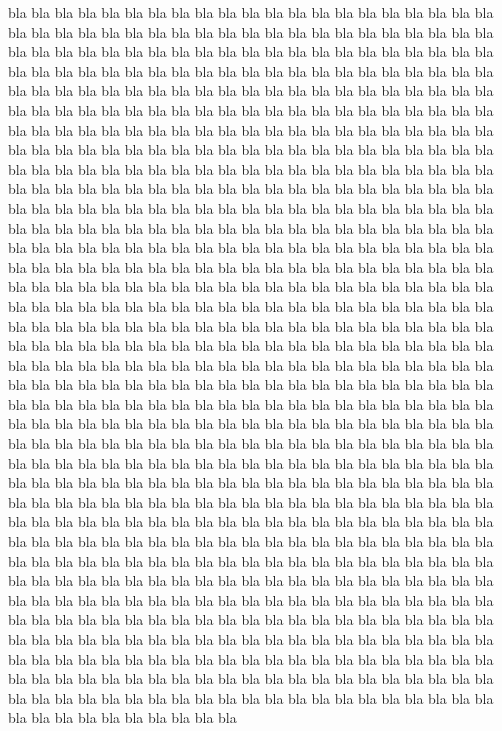 \documentclass[12pt]{book}%
\theoremstyle{definition}%
\begin{document}
bla bla bla bla bla bla bla bla bla bla bla bla bla bla bla bla bla bla bla bla bla bla bla bla bla bla bla bla bla bla bla bla bla bla bla bla bla bla bla bla bla bla bla bla bla bla bla bla bla bla bla bla bla bla bla bla bla bla bla bla bla bla bla bla bla bla bla bla bla bla bla bla bla bla bla bla bla bla bla bla bla bla bla bla bla bla bla bla bla bla bla bla bla bla bla bla bla bla bla bla bla bla bla bla bla bla bla bla bla bla bla bla bla bla bla bla bla bla bla bla bla bla bla bla bla bla bla bla bla bla bla bla bla bla bla bla bla bla bla bla bla bla bla bla bla bla bla bla bla bla bla bla bla bla bla bla bla bla bla bla bla bla bla bla bla bla bla bla bla bla bla bla bla bla bla bla bla bla bla bla bla bla bla bla bla bla bla bla bla bla bla bla bla bla bla bla bla bla bla bla bla bla bla bla bla bla bla bla bla bla bla bla bla bla bla bla bla bla bla bla bla bla bla bla bla bla bla bla bla bla bla bla bla bla bla bla bla bla bla bla bla bla bla bla bla bla bla bla bla bla bla bla bla bla bla bla bla bla bla bla bla bla bla bla bla bla bla bla bla bla bla bla bla bla bla bla bla bla bla bla bla bla bla bla bla bla bla bla bla bla bla bla bla bla bla bla bla bla bla bla bla bla bla bla bla bla bla bla bla bla bla bla bla bla bla bla bla bla bla bla bla bla bla bla bla bla bla bla bla bla bla bla bla bla bla bla bla bla bla bla bla bla bla bla bla bla bla bla bla bla bla bla bla bla bla bla bla bla bla bla bla bla bla bla bla bla bla bla bla bla bla bla bla bla bla bla bla bla bla bla bla bla bla bla bla bla bla bla bla bla bla bla bla bla bla bla bla bla bla bla bla bla bla bla bla bla bla bla bla bla bla bla bla bla bla bla bla bla bla bla bla bla bla bla bla bla bla bla bla bla bla bla bla bla bla bla bla bla bla bla bla bla bla bla bla bla bla bla bla bla bla bla bla bla bla bla bla bla bla bla bla bla bla bla bla bla bla bla bla bla bla bla bla bla bla bla bla bla bla bla bla bla bla bla bla bla bla bla bla bla bla bla bla bla bla bla bla bla bla bla bla bla bla bla bla bla bla bla bla bla bla bla bla bla bla bla bla bla bla bla bla bla bla bla bla bla bla bla bla bla bla bla bla bla bla bla bla bla bla bla bla bla bla bla bla bla bla bla bla bla bla bla bla bla bla bla bla bla bla bla bla bla bla bla bla bla bla bla bla bla bla bla bla bla bla bla bla bla bla bla bla bla bla bla bla bla bla bla bla bla bla bla bla bla bla bla bla bla bla bla bla bla bla bla bla bla bla bla bla bla bla bla bla bla bla bla bla bla bla bla bla bla bla bla bla bla bla bla bla bla bla bla bla bla bla bla bla bla bla bla bla bla bla bla bla bla bla bla bla bla bla bla bla bla bla bla bla bla bla bla bla bla bla bla bla bla bla bla bla bla bla bla bla bla bla bla bla bla bla bla bla bla bla bla bla bla bla bla bla bla bla bla bla bla bla bla bla bla bla bla bla bla bla bla bla bla bla bla bla bla bla bla bla bla bla bla bla bla bla bla bla bla bla bla bla bla bla bla bla bla bla bla bla bla bla bla bla bla bla bla bla bla bla bla bla bla bla bla bla bla bla bla bla bla bla bla bla bla bla bla bla bla bla bla bla bla 
\end{document}
